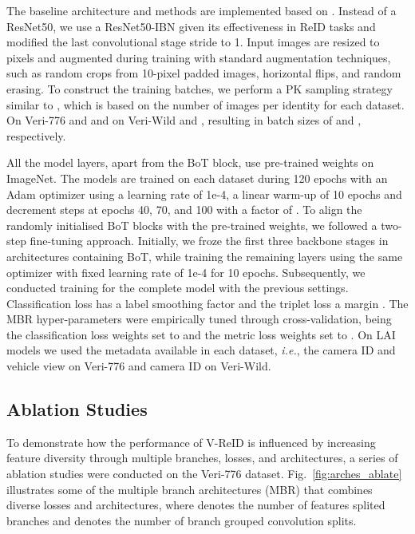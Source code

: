 \documentclass[letterpaper, 10pt, conference]{ieeeconf}
\begin{document}
The baseline architecture and methods are implemented based on \cite{luo2019bag}. Instead of a ResNet50, we use a ResNet50-IBN \cite{pan2018two} given its effectiveness in ReID tasks and modified the last convolutional stage stride to 1.
Input images are resized to  pixels and augmented during training with standard augmentation techniques, such as  random crops from 10-pixel padded images, horizontal flips, and random erasing. To construct the training batches, we perform a PK sampling strategy similar to \cite{zhao2021heterogeneous,sun2020CFVMNet, he2020fastreid, article}, which is based on the number of images per identity for each dataset. On Veri-776  and  and on Veri-Wild  and , resulting in batch sizes of  and , respectively.

All the model layers, apart from the BoT block, use pre-trained weights on ImageNet. The models are trained on each dataset during 120 epochs with an Adam optimizer using a learning rate of 1e-4, a linear warm-up of 10 epochs and decrement steps at epochs 40, 70, and 100 with a factor of .
To align the randomly initialised BoT blocks with the pre-trained weights, we followed a two-step fine-tuning approach. Initially, we froze the first three backbone stages in architectures containing BoT, while training the remaining layers using the same optimizer with fixed learning rate of 1e-4 for 10 epochs. Subsequently, we conducted training for the complete model with the previous settings.
Classification loss has a label smoothing factor  and the triplet loss a margin . The MBR hyper-parameters were empirically tuned through cross-validation, being the classification loss weights set to  and the metric loss weights set to .
On LAI models we used the metadata available in each dataset, \textit{i.e.}, the camera ID and vehicle view on Veri-776 and camera ID on Veri-Wild.





\subsection{Ablation Studies}



To demonstrate how the performance of V-ReID is influenced by increasing feature diversity through multiple branches, losses, and architectures, a series of ablation studies were conducted on the Veri-776 dataset. 
Fig.~\ref{fig:arches_ablate} illustrates some of the multiple branch architectures (MBR) that combines diverse losses and architectures, where  denotes the number of features splited branches and  denotes the number of branch grouped convolution splits. 
\end{document}

